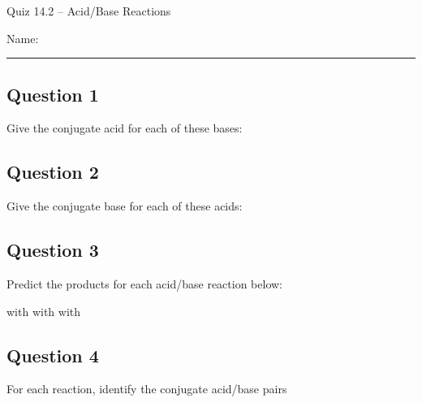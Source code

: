 \documentclass[11pt, letterpaper]{memoir}
\begin{document}
	\begin{center}
		{\large	Quiz 14.2 -- Acid/Base Reactions}
	\end{center}
	{\large Name: \rule[-1mm]{4in}{.1pt} 
	
	
	\subsection*{Question 1}
	Give the conjugate acid for each of these bases:
	
	{\large {} \hspace{3em} \hspace{3em} \hspace{3em} \hspace{3em} \hspace{3em} \hspace{3em} \hspace{3em}}		
	
	\vspace{3em}
	\subsection*{Question 2}
	Give the conjugate base for each of these acids:
	
	{\large {} \hspace{3em} \hspace{3em} \hspace{3em} \hspace{3em} \hspace{3em} \hspace{3em}\hspace{3em}}
	
	\vspace{3em}
	\subsection*{Question 3}
	Predict the products for each acid/base reaction below:
	
	{\large {} with  \hspace{7em}  with  \hspace{7em}  with }
	
	\vspace{3em}
	\subsection*{Question 4}
	For each reaction, identify the conjugate acid/base pairs
	
}
\end{document}
